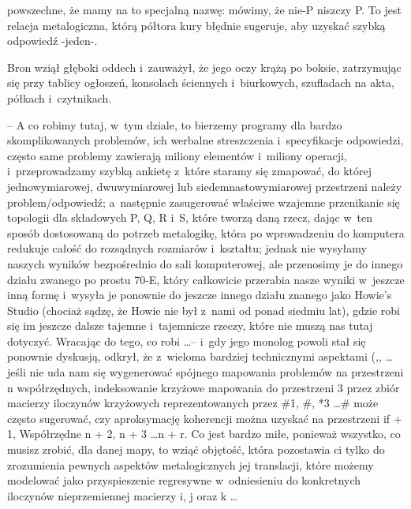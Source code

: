 \documentclass[oneside,polish,11pt,rmheadings]{mwbk}
\begin{document}
powszechne, że mamy na to specjalną nazwę: mówimy, że nie-P niszczy P.  To jest relacja metalogiczna, którą półtora kury błędnie sugeruje, aby uzyskać szybką odpowiedź -jeden-. 

Bron wziął głęboki oddech i~zauważył, że jego oczy krążą po boksie, zatrzymując się przy tablicy ogłoszeń, konsolach ściennych i~biurkowych, szufladach na akta, półkach i~czytnikach. 

-- A co robimy tutaj, w~tym dziale, to bierzemy programy dla bardzo skomplikowanych problemów, ich werbalne streszczenia i~specyfikacje odpowiedzi, często same problemy zawierają miliony elementów i~miliony operacji, i~przeprowadzamy szybką ankietę z~które staramy się zmapować, do której jednowymiarowej, dwuwymiarowej lub siedemnastowymiarowej przestrzeni należy problem/odpowiedź; a~następnie zasugerować właściwe wzajemne przenikanie się topologii dla składowych P, Q, R i~S, które tworzą daną rzecz, dając w~ten sposób dostosowaną do potrzeb metalogikę, która po wprowadzeniu do komputera redukuje całość do rozsądnych rozmiarów i~kształtu; jednak nie wysyłamy naszych wyników bezpośrednio do sali komputerowej, ale przenosimy je do innego działu zwanego po prostu 70-E, który całkowicie przerabia nasze wyniki w~jeszcze inną formę i~wysyła je ponownie do jeszcze innego działu znanego jako Howie's Studio (chociaż sądzę, że Howie nie był z~nami od ponad siedmiu lat), gdzie robi się im jeszcze dalsze tajemne i~tajemnicze rzeczy, które nie muszą nas tutaj dotyczyć. Wracając do tego, co robi \ldots  -- i~gdy jego monolog powoli stał się ponownie dyskusją, odkrył, że z~wieloma bardziej technicznymi aspektami (,, \ldots  jeśli nie uda nam się wygenerować spójnego mapowania problemów na przestrzeni n współrzędnych, indeksowanie krzyżowe mapowania do przestrzeni 3 przez zbiór macierzy iloczynów krzyżowych reprezentowanych przez \#1, \#, *3 \ldots  \# może często sugerować, czy aproksymację koherencji można uzyskać na przestrzeni if + 1, Współrzędne n + 2, n + 3  \ldots  n + r. Co jest bardzo miłe, ponieważ wszystko, co musisz zrobić, dla danej mapy, to wziąć objętość, która pozostawia ci tylko do zrozumienia pewnych aspektów metalogicznych jej translacji, które możemy modelować jako przyspieszenie regresywne w~odniesieniu do konkretnych iloczynów nieprzemiennej macierzy i, j oraz k  \ldots 
\end{document}
